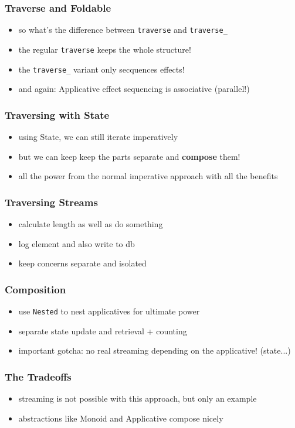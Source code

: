 \documentclass[aspectratio=169]{beamer}
\begin{document}
\begin{frame}
  \frametitle{Traverse and Foldable}
  \begin{itemize}
  \item so what's the difference between \texttt{traverse} and \texttt{traverse\_}
  \item the regular \texttt{traverse} keeps the whole structure!
  \item the \texttt{traverse\_} variant only secquences effects!
  \item and again: Applicative effect sequencing is associative (parallel!)
  \end{itemize}
\end{frame}

\begin{frame}
  \frametitle{Traversing with State}
  \begin{itemize}
  \item using State, we can still iterate imperatively
  \item but we can keep keep the parts separate and \textbf{compose} them!
  \item all the power from the normal imperative approach with all the benefits
  \end{itemize}
\end{frame}

\begin{frame}
  \frametitle{Traversing Streams}
  \begin{itemize}
  \item calculate length as well as do something
  \item log element and also write to db
  \item keep concerns separate and isolated
  \end{itemize}
\end{frame}

\begin{frame}
  \frametitle{Composition}
  \begin{itemize}
  \item use \texttt{Nested} to nest applicatives for ultimate power
  \item separate state update and retrieval + counting
  \item important gotcha: no real streaming depending on the applicative! (state...)
  \end{itemize}
\end{frame}

\begin{frame}
  \frametitle{The Tradeoffs}
  \begin{itemize}
  \item streaming is not possible with this approach, but only an example
  \item abstractions like Monoid and Applicative compose nicely
  \end{itemize}
\end{frame}
\end{document}
